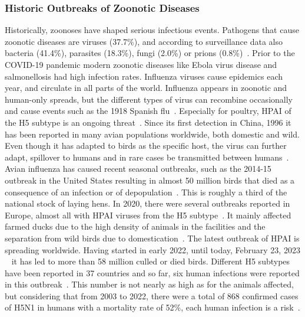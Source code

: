 \subsubsection*{Historic Outbreaks of Zoonotic Diseases}
Historically, zoonoses have shaped serious infectious events. Pathogens that cause zoonotic diseases are viruses (37.7\%), and according to surveillance data also bacteria (41.4\%), parasites (18.3\%), fungi (2.0\%) or prions (0.8\%)~\cite{salyer2017prioritizing}. Prior to the \ac{COVID-19} pandemic modern zoonotic diseases like Ebola virus disease and salmonellosis had high infection rates. Influenza viruses cause epidemics each year, and circulate in all parts of the world. Influenza appears in zoonotic and human-only spreads, but the different types of virus can recombine occasionally and cause events such as the 1918 Spanish flu~\cite{garten2009antigenic, gibbs2001recombination}. Especially for poultry, \ac{HPAI} of the H5 subtype is an ongoing threat~\cite{lee2017evolution}. Since its first detection in China, 1996 it has been reported in many avian populations worldwide, both domestic and wild. Even though it has adapted to birds as the specific host, the virus can further adapt, spillover to humans and in rare cases be transmitted between humans~\cite{webster1992evolution}. Avian influenza has caused recent seasonal outbreaks, such as the 2014-15 outbreak in the United States resulting in almost 50 million birds that died as a consequence of an infection or of depopulation~\cite{lee2016highly}. This is roughly a third of the national stock of laying hens. In 2020, there were several outbreaks reported in Europe, almost all with \ac{HPAI} viruses from the H5 subtype~\cite{lewis2021emergence}. It mainly affected farmed ducks due to the high density of animals in the facilities and the separation from wild birds due to domestication~\cite{lewis2021emergence}. The latest outbreak of \ac{HPAI} is spreading worldwide. Having started in early 2022, until today, February 23, 2023 ~ it has led to more than 58 million culled or died birds. Different H5 subtypes have been reported in 37 countries and so far, six human infections were reported in this outbreak~\cite{authority2023avian}. This number is not nearly as high as for the animals affected, but considering that from 2003 to 2022, there were a total of 868 confirmed cases of H5N1 in humans with a mortality rate of 52\%, each human infection is a risk~\cite{authority2023avian}.

